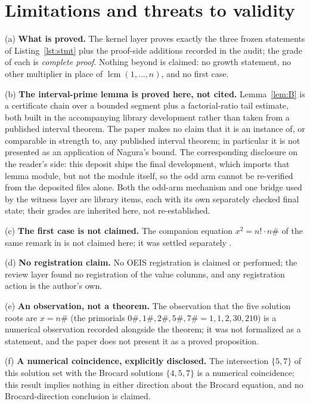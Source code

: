 \documentclass[11pt]{article}
\theoremstyle{definition}
\begin{document}
\section{Limitations and threats to validity}\label{sec:limits}

(a) \textbf{What is proved.} The kernel layer proves exactly the three frozen
statements of Listing~\ref{lst:stmt} plus the proof-side additions recorded in
the audit; the grade of each is \emph{complete proof}. Nothing beyond is
claimed: no growth statement, no other multiplier in place of
$\operatorname{lcm}(1,\dots,n)$, and no first case.

(b) \textbf{The interval-prime lemma is proved here, not cited.}
Lemma~\ref{lem:B} is a certificate chain over a bounded segment plus a
factorial-ratio tail estimate, both built in the accompanying library
development rather than taken from a published interval theorem. The paper
makes no claim that it is an instance of, or comparable in strength to, any
published interval theorem; in particular it is not presented as an
application of Nagura's bound. The corresponding disclosure on the reader's
side: this deposit ships the final development, which imports that lemma
module, but not the module itself, so the odd arm cannot be re-verified from
the deposited files alone. Both the odd-arm mechanism and one bridge used by
the witness layer are library items, each with its own separately checked final
state; their grades are inherited here, not re-established.

(c) \textbf{The first case is not claimed.} The companion equation
$x^2 = n! \cdot n\#$ of the same remark in \cite{novakovic2026} is not claimed
here; it was settled separately \cite{nfactpaper}.

(d) \textbf{No registration claim.} No OEIS registration is claimed or
performed; the review layer found no registration of the value columns, and
any registration action is the author's own.

(e) \textbf{An observation, not a theorem.} The observation that the five
solution roots are $x = n\#$ (the primorials $0\#, 1\#, 2\#, 5\#, 7\# =
1, 1, 2, 30, 210$) is a numerical observation recorded alongside the theorem;
it was not formalized as a statement, and the paper does not present it as a
proved proposition.

(f) \textbf{A numerical coincidence, explicitly disclosed.} The intersection
$\{5,7\}$ of this solution set with the Brocard solutions $\{4,5,7\}$ is a
numerical coincidence; this result implies nothing in either direction about
the Brocard equation, and no Brocard-direction conclusion is claimed.
\end{document}
